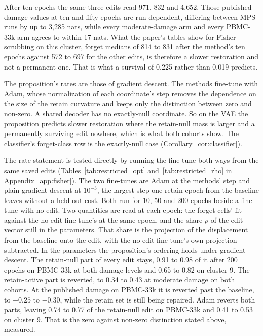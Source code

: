 \documentclass{article}
\begin{document}
After ten epochs the same three edits read 971, 832 and 4,652. Those published-damage values at ten and fifty epochs are run-dependent, differing between MPS runs by up to 3,285 nats, while every moderate-damage arm and every PBMC-33k arm agrees to within 17 nats. What the paper's tables show for Fisher scrubbing on this cluster, forget medians of 814 to 831 after the method's ten epochs against 572 to 697 for the other edits, is therefore a slower restoration and not a permanent one. That is what a survival of 0.225 rather than 0.019 predicts.

The proposition's rates are those of gradient descent. The methods fine-tune with Adam, whose normalization of each coordinate's step removes the dependence on the size of the retain curvature and keeps only the distinction between zero and non-zero. A shared decoder has no exactly-null coordinate. So on the VAE the proposition predicts slower restoration where the retain-null mass is larger and a permanently surviving edit nowhere, which is what both cohorts show. The classifier's forget-class row is the exactly-null case (Corollary~\ref{cor:classifier}).

The rate statement is tested directly by running the fine-tune both ways from the same saved edits (Tables~\ref{tab:restricted_opt} and~\ref{tab:restricted_rho} in Appendix~\ref{app:fisher}). The two fine-tunes are Adam at the methods' step and plain gradient descent at $10^{-3}$, the largest step one retain epoch from the baseline leaves without a held-out cost. Both run for 10, 50 and 200 epochs beside a fine-tune with no edit. Two quantities are read at each epoch: the forget cells' fit against the no-edit fine-tune's at the same epoch, and the share $\rho$ of the edit vector still in the parameters. That share is the projection of the displacement from the baseline onto the edit, with the no-edit fine-tune's own projection subtracted. In the parameters the proposition's ordering holds under gradient descent. The retain-null part of every edit stays, 0.91 to 0.98 of it after 200 epochs on PBMC-33k at both damage levels and 0.65 to 0.82 on cluster 9. The retain-active part is reverted, to 0.34 to 0.43 at moderate damage on both cohorts. At the published damage on PBMC-33k it is reverted past the baseline, to $-0.25$ to $-0.30$, while the retain set is still being repaired. Adam reverts both parts, leaving 0.74 to 0.77 of the retain-null edit on PBMC-33k and 0.41 to 0.53 on cluster 9. That is the zero against non-zero distinction stated above, measured.
\end{document}
